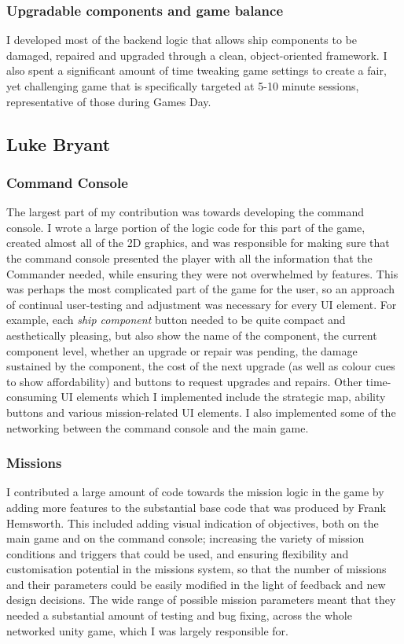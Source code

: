 \documentclass[a4paper,11pt]{article}
\begin{document}
\subsubsection{Upgradable components and game balance}

I developed most of the backend logic that allows ship components to be damaged, repaired and upgraded through a clean, object-oriented framework. I also spent a significant amount of time tweaking game settings to create a fair, yet challenging game that is specifically targeted at 5-10 minute sessions, representative of those during Games Day.

\clearpage

\subsection{Luke Bryant}

\subsubsection{Command Console}

The largest part of my contribution was towards developing the command console. I wrote a large portion of the logic code for this part of the game, created almost all of the 2D graphics, and was responsible for making sure that the command console presented the player with all the information that the Commander needed, while ensuring they were not overwhelmed by features. This was perhaps the most complicated part of the game for the user, so an approach of continual user-testing and adjustment was necessary for every UI element. For example, each \emph{ship component} button needed to be quite compact and aesthetically pleasing, but also show the name of the component, the current component level, whether an upgrade or repair was pending, the damage sustained by the component, the cost of the next upgrade (as well as colour cues to show affordability) and buttons to request upgrades and repairs. Other time-consuming UI elements which I implemented include the strategic map, ability buttons and various mission-related UI elements. I also implemented some of the networking between the command console and the main game.

\subsubsection{Missions}

I contributed a large amount of code towards the mission logic in the game by adding more features to the substantial base code that was produced by Frank Hemsworth. This included adding visual indication of objectives, both on the main game and on the command console; increasing the variety of mission conditions and triggers that could be used, and ensuring flexibility and customisation potential in the missions system, so that the number of missions and their parameters could be easily modified in the light of feedback and new design decisions. The wide range of possible mission parameters meant that they needed a substantial amount of testing and bug fixing, across the whole networked unity game, which I was largely responsible for.
\end{document}
